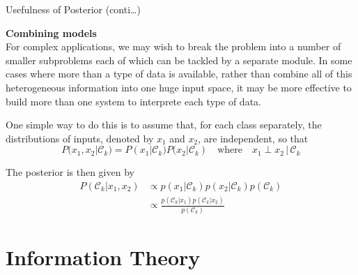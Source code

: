 \documentclass{bredelebeamer}
\begin{document}
\begin{frame}{Usefulness of Posterior (conti\ldots)}
  \begin{justify}
    \textbf{Combining models}\\
    For complex applications, we may wish to break the problem into a number of
    smaller subproblems each of which can be tackled by a separate module. In
    some cases where more than a type of data is available, rather than combine
    all of this heterogeneous information into one huge input space, it may be
    more effective to build more than one system to interprete each type of data.

    \vspace{0.5\baselineskip}
    One simple way to do this is to assume that, for each class separately, the
    distributions of inputs, denoted by $x_1$ and $x_2$, are independent, so that
    \begin{equation}
        P(x_1, x_2|\mathcal{C}_k) = P(x_1 | \mathcal{C}_k) P(x_2|\mathcal{C}_k)
        \quad \textrm{where} \quad x_1 \perp x_2 \,|\, \mathcal{C}_k
    \end{equation}

    The posterior is then given by
    \begin{equation}
      \begin{split}
        P(\mathcal{C}_k|x_1, x_2)
          & \propto p(x_1|\mathcal{C}_k) p(x_2|\mathcal{C}_k) p(\mathcal{C}_k) \\
          & \propto \frac{p(\mathcal{C}_k|x_1) p(\mathcal{C}_k|x_2)}{p(\mathcal{C}_k)}
      \end{split}
    \end{equation}
  \end{justify}
\end{frame}


\section{Information Theory}
\end{document}
